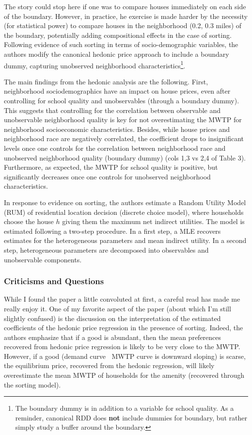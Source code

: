 \documentclass[12pt, final]{article}
\begin{document}
The story could stop here if one was to compare houses immediately on each side of the boundary. However, in practice, he exercise is made harder by the necessity (for statistical power) to compare houses in the neighborhood (0.2, 0.3 miles) of the boundary, potentially adding compositional effects in the case of sorting. Following evidence of such sorting in terms of socio-demographic variables, the authors modify the canonical hedonic price approach to include a boundary dummy, capturing unobserved neighborhood characteristics\footnote{The boundary dummy is in addition to a variable for school quality. As a reminder, canonical RDD does \textbf{not} include dummies for boundary, but rather simply study a buffer around the boundary.}.

The main findings from the hedonic analysis are the following. First, neighborhood sociodemographics have an impact on house prices, even after controlling for school quality and unobservables (through a boundary dummy). This suggests that controlling for the correlation between observable and unobservable neighborhood quality is key for not overestimating the MWTP for neighborhood socioeconomic characteristics. Besides, while house prices and neighborhood race are negatively correlated, the coefficient drops to insignificant levels once one controls for the correlation between neighborhood race and unobserved neighborhood quality (boundary dummy) (cols 1,3 vs 2,4 of Table 3). Furthermore, as expected, the MWTP for school quality is positive, but significantly decreases once one controls for unobserved neighborhood characteristics.

In response to evidence on sorting, the authors estimate a Random Utility Model (RUM) of residential location decision (discrete choice model), where households choose the house $h$ giving them the maximum net indirect utilities. The model is estimated following a two-step procedure. In a first step, a MLE recovers estimates for the heterogeneous parameters and mean indirect utility. In a second step, heterogeneous parameters are decomposed into observables and unobservable components.



\subsubsection*{Criticisms and Questions} %
\label{ssub:criticisms_and_questions}

While I found the paper a little convoluted at first, a careful read has made me really enjoy it.
One of my favorite aspect of the paper (about which I'm still slightly confused) is the discussion on the interpretation of the estimated coefficients of the hedonic price regression in the presence of sorting. Indeed, the authors emphasize that if a good is abundant, then the mean preferences recovered from hedonic price regression is likely to be very close to the MWTP. However, if a good (demand curve $~$ MWTP curve is downward sloping) is scarse, the equilibrium price, recovered from the hedonic regression, will likely overestimate the mean MWTP of households for the amenity (recovered through the sorting model).
\end{document}
